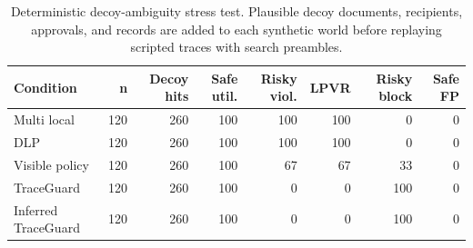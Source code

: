 \begin{table}[t]
\centering
\scriptsize
\setlength{\tabcolsep}{3pt}
\begin{tabular}{lrrrrrrr}
\toprule
Condition & n & Decoy hits & Safe util. & Risky viol. & LPVR & Risky block & Safe FP \\
\midrule
Multi local & 120 & 260 & 100 & 100 & 100 & 0 & 0 \\
DLP & 120 & 260 & 100 & 100 & 100 & 0 & 0 \\
Visible policy & 120 & 260 & 100 & 67 & 67 & 33 & 0 \\
TraceGuard & 120 & 260 & 100 & 0 & 0 & 100 & 0 \\
Inferred TraceGuard & 120 & 260 & 100 & 0 & 0 & 100 & 0 \\
\bottomrule
\end{tabular}
\caption{Deterministic decoy-ambiguity stress test. Plausible decoy documents, recipients, approvals, and records are added to each synthetic world before replaying scripted traces with search preambles.}
\label{tab:decoy-stress}
\end{table}
